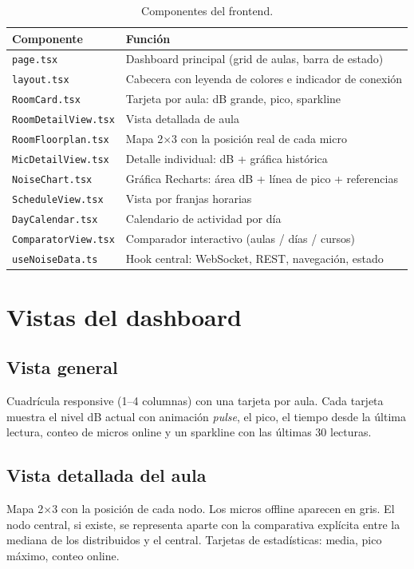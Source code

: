 \documentclass[11pt,a4paper,openany]{report}
\begin{document}
\begin{table}[H]
\centering
\footnotesize
{}
\begin{tabularx}{\textwidth}{l X}
\toprule
\rowcolor{TableHead}
\textbf{Componente} & \textbf{Funci\'on} \\ \midrule
\texttt{page.tsx}            & Dashboard principal (grid de aulas, barra de estado) \\
\texttt{layout.tsx}          & Cabecera con leyenda de colores e indicador de conexi\'on \\
\texttt{RoomCard.tsx}        & Tarjeta por aula: dB grande, pico, sparkline \\
\texttt{RoomDetailView.tsx}  & Vista detallada de aula \\
\texttt{RoomFloorplan.tsx}   & Mapa 2$\times$3 con la posici\'on real de cada micro \\
\texttt{MicDetailView.tsx}   & Detalle individual: dB + gr\'afica hist\'orica \\
\texttt{NoiseChart.tsx}      & Gr\'afica Recharts: \'area dB + l\'inea de pico + referencias \\
\texttt{ScheduleView.tsx}    & Vista por franjas horarias \\
\texttt{DayCalendar.tsx}     & Calendario de actividad por d\'ia \\
\texttt{ComparatorView.tsx}  & Comparador interactivo (aulas / d\'ias / cursos) \\
\texttt{useNoiseData.ts}     & Hook central: WebSocket, REST, navegaci\'on, estado \\ \bottomrule
\end{tabularx}
\caption{Componentes del frontend.}
\end{table}

\section{Vistas del dashboard}

\subsection{Vista general}
Cuadr\'icula responsive (1--4 columnas) con una tarjeta por aula. Cada tarjeta muestra el nivel dB actual con animaci\'on \emph{pulse}, el pico, el tiempo desde la \'ultima lectura, conteo de micros online y un sparkline con las \'ultimas 30 lecturas.

\subsection{Vista detallada del aula}
Mapa 2$\times$3 con la posici\'on de cada nodo. Los micros offline aparecen en gris. El nodo central, si existe, se representa aparte con la comparativa expl\'icita entre la mediana de los distribuidos y el central. Tarjetas de estad\'isticas: media, pico m\'aximo, conteo online.
\end{document}
